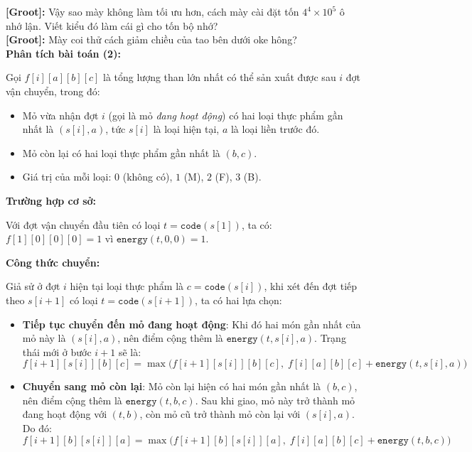 \textbf{[Groot]:} Vậy sao mày không làm tối ưu hơn, cách mày cài đặt tốn $4^4 \times 10^5$ ô nhớ lận. Viết kiểu đó làm cái gì cho tốn bộ nhớ?\\

\textbf{[Groot]:} Mày coi thử cách giảm chiều của tao bên dưới oke hông?\\

\textbf{Phân tích bài toán (2):}

Gọi $f[i][a][b][c]$ là tổng lượng than lớn nhất có thể sản xuất được sau $i$ đợt vận chuyển, trong đó:
\begin{itemize}
    \item Mỏ vừa nhận đợt $i$ (gọi là mỏ \textit{đang hoạt động}) có hai loại thực phẩm gần nhất là $(s[i], a)$, tức $s[i]$ là loại hiện tại, $a$ là loại liền trước đó.
    \item Mỏ còn lại có hai loại thực phẩm gần nhất là $(b, c)$.
    \item Giá trị của mỗi loại: $0$ (không có), $1$ (M), $2$ (F), $3$ (B).
\end{itemize}

\textbf{Trường hợp cơ sở:}

Với đợt vận chuyển đầu tiên có loại $t = \texttt{code}(s[1])$, ta có: $f[1][0][0][0] = 1$
vì $\texttt{energy}(t,0,0) = 1$.

\textbf{Công thức chuyển:}

Giả sử ở đợt $i$ hiện tại loại thực phẩm là $c = \texttt{code}(s[i])$, khi xét đến đợt tiếp theo $s[i+1]$ có loại $t = \texttt{code}(s[i+1])$, ta có hai lựa chọn:

\begin{itemize}
    \item \textbf{Tiếp tục chuyển đến mỏ đang hoạt động}:  
    Khi đó hai món gần nhất của mỏ này là $(s[i], a)$, nên điểm cộng thêm là $\texttt{energy}(t, s[i], a)$.  
    Trạng thái mới ở bước $i+1$ sẽ là:
    \[
    f[i+1][s[i]][b][c] = \max\Big(f[i+1][s[i]][b][c],\; f[i][a][b][c] + \texttt{energy}(t, s[i], a)\Big)
    \]

    \item \textbf{Chuyển sang mỏ còn lại}:  
    Mỏ còn lại hiện có hai món gần nhất là $(b, c)$, nên điểm cộng thêm là $\texttt{energy}(t, b, c)$.  
    Sau khi giao, mỏ này trở thành mỏ đang hoạt động với $(t, b)$, còn mỏ cũ trở thành mỏ còn lại với $(s[i], a)$.  
    Do đó:
    \[
    f[i+1][b][s[i]][a] = \max\Big(f[i+1][b][s[i]][a],\; f[i][a][b][c] + \texttt{energy}(t, b, c)\Big)
    \]
\end{itemize}

